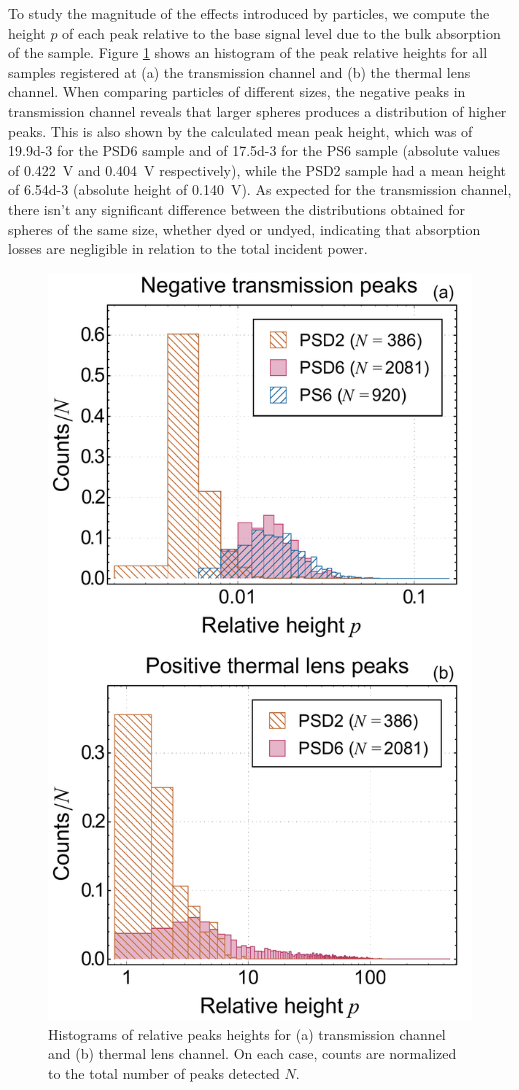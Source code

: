 \documentclass[9pt,twocolumn,twoside]{osajnl}
\begin{document}
To study the magnitude of the effects introduced by particles, we compute the height $p$ of each peak relative to the base signal level due to the bulk absorption of the sample. Figure \ref{fig:PeakHistogram} shows an histogram of the peak relative heights for all samples registered at (a) the transmission channel and (b) the thermal lens channel. When comparing particles of different sizes, the negative peaks in transmission channel reveals that larger spheres produces a distribution of higher peaks. This is also shown by the calculated mean peak height, which was of \SI{19.9d-3}{} for the PSD6 sample and of \SI{17.5d-3}{} for the PS6 sample (absolute values of \SI{0.422}{\volt} and \SI{0.404}{\volt} respectively), while the PSD2 sample had a mean height of \SI{6.54d-3}{} (absolute height of \SI{0.140}{\volt}). As expected for the transmission channel, there isn't any significant difference between the distributions obtained for spheres of the same size, whether dyed or undyed, indicating that absorption losses are negligible in relation to the total incident power.

\begin{figure}[t!]
	\centering \includegraphics[width=.46\textwidth]{figures/PeakHeightDistribution.pdf}
	\caption{Histograms of relative peaks heights for (a) transmission channel and (b) thermal lens channel. On each case, counts are normalized to the total number of peaks detected $N$.}
	\label{fig:PeakHistogram}
\end{figure}
\end{document}
